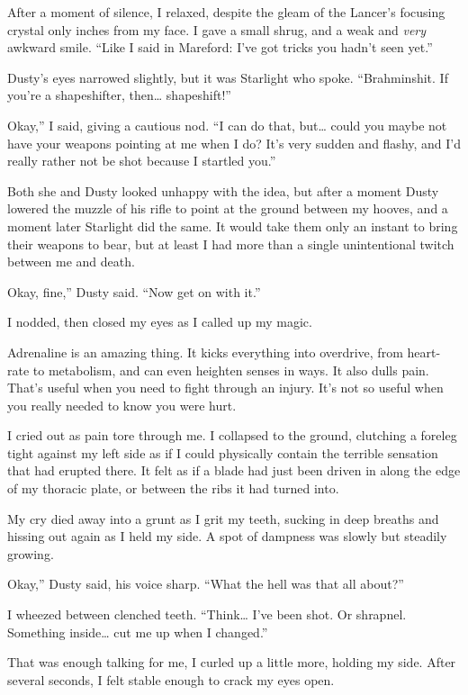 After a moment of silence, I relaxed, despite the gleam of the Lancer’s focusing crystal only inches from my face. I gave a small shrug, and a weak and \textit{very} awkward smile. “Like I said in Mareford: I’ve got tricks you hadn’t seen yet.”

Dusty’s eyes narrowed slightly, but it was Starlight who spoke. “Brahminshit. If you’re a shapeshifter, then… shapeshift!”

\leavevmode{}Okay,” I said, giving a cautious nod. “I can do that, but… could you maybe not have your weapons pointing at me when I do? It’s very sudden and flashy, and I’d really rather not be shot because I startled you.”

Both she and Dusty looked unhappy with the idea, but after a moment Dusty lowered the muzzle of his rifle to point at the ground between my hooves, and a moment later Starlight did the same. It would take them only an instant to bring their weapons to bear, but at least I had more than a single unintentional twitch between me and death.

\leavevmode{}Okay, fine,” Dusty said. “Now get on with it.”

I nodded, then closed my eyes as I called up my magic.

Adrenaline is an amazing thing. It kicks everything into overdrive, from heart-rate to metabolism, and can even heighten senses in ways. It also dulls pain. That’s useful when you need to fight through an injury. It’s not so useful when you really needed to know you were hurt.

I cried out as pain tore through me. I collapsed to the ground, clutching a foreleg tight against my left side as if I could physically contain the terrible sensation that had erupted there. It felt as if a blade had just been driven in along the edge of my thoracic plate, or between the ribs it had turned into.

My cry died away into a grunt as I grit my teeth, sucking in deep breaths and hissing out again as I held my side. A spot of dampness was slowly but steadily growing.

\leavevmode{}Okay,” Dusty said, his voice sharp. “What the hell was that all about?”

I wheezed between clenched teeth. “Think… I’ve been shot. Or shrapnel. Something inside… cut me up when I changed.”

That was enough talking for me, I curled up a little more, holding my side. After several seconds, I felt stable enough to crack my eyes open.

